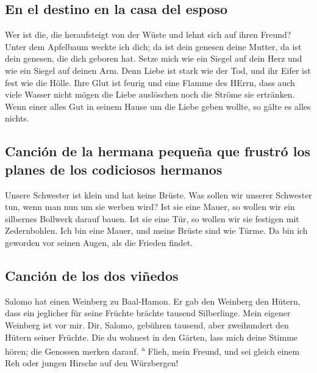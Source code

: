 \hypertarget{en-el-destino-en-la-casa-del-esposo}{%
\subsection{En el destino en la casa del
esposo}\label{en-el-destino-en-la-casa-del-esposo}}

 Wer ist die, die heraufsteigt von der Wüste und lehnt
sich auf ihren Freund? Unter dem Apfelbaum weckte ich dich; da ist dein
genesen deine Mutter, da ist dein genesen, die dich geboren hat.
 Setze mich wie ein Siegel auf dein Herz und wie ein
Siegel auf deinen Arm. Denn Liebe ist stark wie der Tod, und ihr Eifer
ist fest wie die Hölle. Ihre Glut ist feurig und eine Flamme des HErrn,
 dass auch viele Wasser nicht mögen die Liebe auslöschen
noch die Ströme sie ertränken. Wenn einer alles Gut in seinem Hause um
die Liebe geben wollte, so gälte es alles nichts.

\hypertarget{canciuxf3n-de-la-hermana-pequeuxf1a-que-frustruxf3-los-planes-de-los-codiciosos-hermanos}{%
\subsection{Canción de la hermana pequeña que frustró los planes de los
codiciosos
hermanos}\label{canciuxf3n-de-la-hermana-pequeuxf1a-que-frustruxf3-los-planes-de-los-codiciosos-hermanos}}

 Unsere Schwester ist klein und hat keine Brüste. Was
sollen wir unserer Schwester tun, wenn man nun um sie werben wird?
 Ist sie eine Mauer, so wollen wir ein silbernes Bollwerk
darauf bauen. Ist sie eine Tür, so wollen wir sie festigen mit
Zedernbohlen.  Ich bin eine Mauer, und meine Brüste sind
wie Türme. Da bin ich geworden vor seinen Augen, als die Frieden findet.

\hypertarget{canciuxf3n-de-los-dos-viuxf1edos}{%
\subsection{Canción de los dos
viñedos}\label{canciuxf3n-de-los-dos-viuxf1edos}}

 Salomo hat einen Weinberg zu Baal-Hamon. Er gab den
Weinberg den Hütern, dass ein jeglicher für seine Früchte brächte
tausend Silberlinge.  Mein eigener Weinberg ist vor mir.
Dir, Salomo, gebühren tausend, aber zweihundert den Hütern seiner
Früchte.  Die du wohnest in den Gärten, lass mich deine
Stimme hören; die Genossen merken darauf. \textsuperscript{a}
 Flieh, mein Freund, und sei gleich einem Reh oder jungen
Hirsche auf den Würzbergen!
